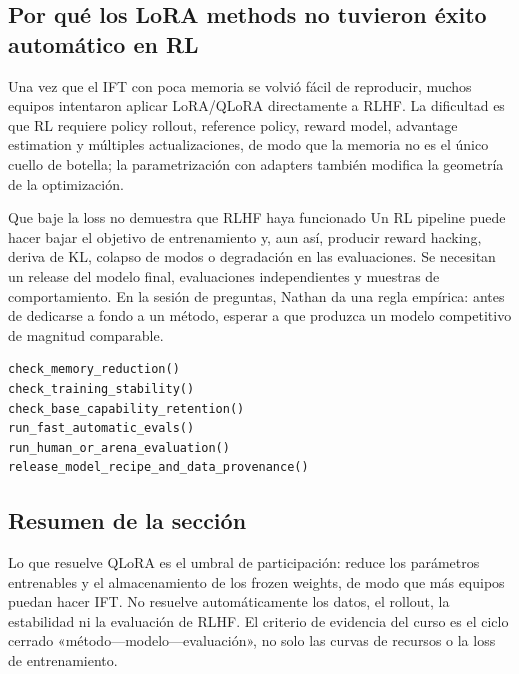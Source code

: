 \subsection{Por qué los LoRA methods no tuvieron éxito automático en RL}

Una vez que el IFT con poca memoria se volvió fácil de reproducir, muchos equipos intentaron aplicar LoRA/QLoRA directamente a RLHF. La dificultad es que RL requiere policy rollout, reference policy, reward model, advantage estimation y múltiples actualizaciones, de modo que la memoria no es el único cuello de botella; la parametrización con adapters también modifica la geometría de la optimización.


\begin{warningbox}{Que baje la loss no demuestra que RLHF haya funcionado}
Un RL pipeline puede hacer bajar el objetivo de entrenamiento y, aun así, producir reward hacking, deriva de KL, colapso de modos o degradación en las evaluaciones. Se necesitan un release del modelo final, evaluaciones independientes y muestras de comportamiento. En la sesión de preguntas, Nathan da una regla empírica: antes de dedicarse a fondo a un método, esperar a que produzca un modelo competitivo de magnitud comparable.
\end{warningbox}


\begin{lstlisting}[caption={Compuertas de validación: de un método eficiente a la publicación de un modelo confiable}]
check_memory_reduction()
check_training_stability()
check_base_capability_retention()
run_fast_automatic_evals()
run_human_or_arena_evaluation()
release_model_recipe_and_data_provenance()
\end{lstlisting}

\subsection{Resumen de la sección}

Lo que resuelve QLoRA es el umbral de participación: reduce los parámetros entrenables y el almacenamiento de los frozen weights, de modo que más equipos puedan hacer IFT. No resuelve automáticamente los datos, el rollout, la estabilidad ni la evaluación de RLHF. El criterio de evidencia del curso es el ciclo cerrado «método—modelo—evaluación», no solo las curvas de recursos o la loss de entrenamiento.
